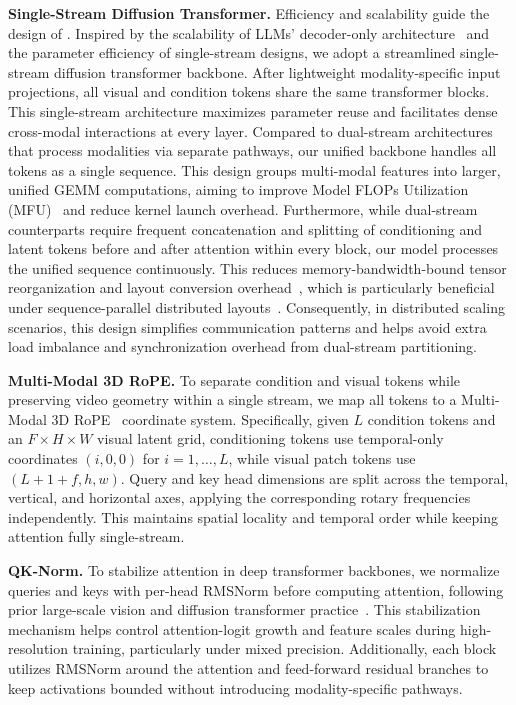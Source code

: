 \noindent\textbf{Single-Stream Diffusion Transformer.}
Efficiency and scalability guide the design of \method. Inspired by the scalability of LLMs' decoder-only architecture~\cite{achiam2023gpt,touvron2023llama,team2023gemini,bai2023qwen} and the parameter efficiency of single-stream designs, we adopt a streamlined single-stream diffusion transformer backbone. After lightweight modality-specific input projections, all visual and condition tokens share the same transformer blocks. This single-stream architecture maximizes parameter reuse and facilitates dense cross-modal interactions at every layer. Compared to dual-stream architectures~\cite{esser2024scaling} that process modalities via separate pathways, our unified backbone handles all tokens as a single sequence. This design groups multi-modal features into larger, unified GEMM computations, aiming to improve Model FLOPs Utilization (MFU)~\cite{chowdhery2022palmscalinglanguagemodeling} and reduce kernel launch overhead. Furthermore, while dual-stream counterparts require frequent concatenation and splitting of conditioning and latent tokens before and after attention within every block, our model processes the unified sequence continuously. This reduces memory-bandwidth-bound tensor reorganization and layout conversion overhead~\cite{dao2022flashattention}, which is particularly beneficial under sequence-parallel distributed layouts~\cite{korthikanti2022reducingactivationrecomputationlarge,jacobs2023deepspeed}. Consequently, in distributed scaling scenarios, this design simplifies communication patterns and helps avoid extra load imbalance and synchronization overhead from dual-stream partitioning.

\noindent\textbf{Multi-Modal 3D RoPE.}
To separate condition and visual tokens while preserving video geometry within a single stream, we map all tokens to a Multi-Modal 3D RoPE~\cite{qin2025lumina,wu2025omnigen2,cai2025z} coordinate system. Specifically, given $L$ condition tokens and an $F \times H \times W$ visual latent grid, conditioning tokens use temporal-only coordinates $(i,0,0)$ for $i=1,\ldots,L$, while visual patch tokens use $(L+1+f,h,w)$.
Query and key head dimensions are split across the temporal, vertical, and horizontal axes, applying the corresponding rotary frequencies independently.
This maintains spatial locality and temporal order while keeping attention fully single-stream.

\noindent\textbf{QK-Norm.}
To stabilize attention in deep transformer backbones, we normalize queries and keys with per-head RMSNorm before computing attention, following prior large-scale vision and diffusion transformer practice~\cite{dehghani2023vit22b,esser2024scaling}.
This stabilization mechanism helps control attention-logit growth and feature scales during high-resolution training, particularly under mixed precision.
Additionally, each block utilizes RMSNorm around the attention and feed-forward residual branches to keep activations bounded without introducing modality-specific pathways.

